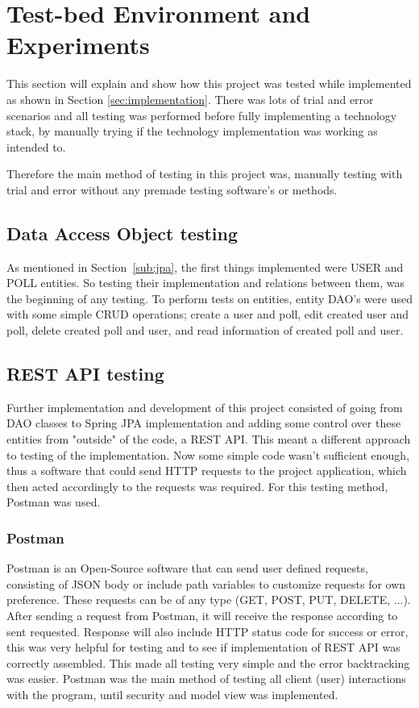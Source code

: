\section{Test-bed Environment and Experiments}
\label{sec:evaluation}

This section will explain and show how this project was tested while implemented as shown in Section \ref{sec:implementation}. There was lots of trial and error scenarios and all testing was performed before fully implementing a technology stack, by manually trying if the technology implementation was working as intended to.

Therefore the main method of testing in this project was, manually testing with trial and error without any premade testing software's or methods.
\subsection{Data Access Object testing}
As mentioned in Section~\ref{sub:jpa}, the first things implemented were USER and POLL entities. So testing their implementation and relations between them, was the beginning of any testing. To perform tests on entities, entity DAO's were used with some simple CRUD operations; create a user and poll, edit created user and poll, delete created poll and user, and read information of created poll and user.

\subsection{REST API testing}
Further implementation and development of this project consisted of going from DAO classes to Spring JPA implementation and adding some control over these entities from "outside" of the code, a REST API. This meant a different approach to testing of the implementation. Now some simple code wasn't sufficient enough, thus a software that could send HTTP requests to the project application, which then acted accordingly to the requests was required. For this testing method, Postman \cite{postman} was used.
\subsubsection{Postman}
Postman is an Open-Source software that can send user defined requests, consisting of JSON body or include path variables to customize requests for own preference. These requests can be of any type (GET, POST, PUT, DELETE, ...). After sending a request from Postman, it will receive the response according to sent requested. Response will also include HTTP status code for success or error, this was very helpful for testing and to see if implementation of REST API was correctly assembled. This made all testing very simple and the error backtracking was easier. Postman was the main method of testing all client (user) interactions with the program, until security and model view was implemented.

